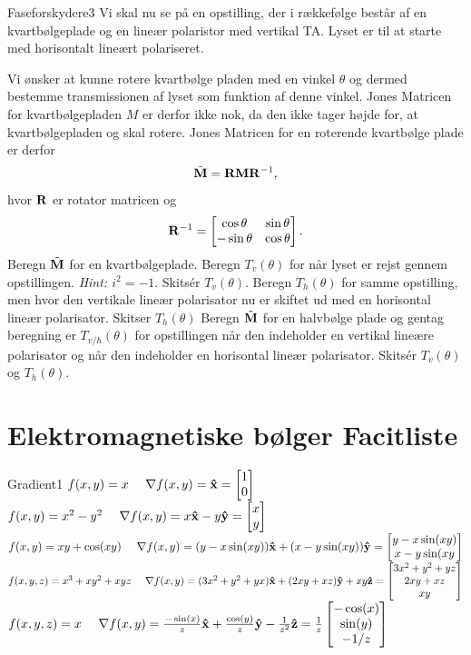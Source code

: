 \begin{opgave}{Faseforskydere}{3}
Vi skal nu se på en opstilling, der i rækkefølge består af en kvartbølgeplade og en lineær polaristor med vertikal TA. Lyset er til at starte med horisontalt lineært polariseret. 

Vi ønsker at kunne rotere kvartbølge pladen med en vinkel $\theta$ og dermed bestemme transmissionen af lyset som funktion af denne vinkel. Jones Matricen for kvartbølgepladen $M$ er derfor ikke nok, da den ikke tager højde for, at kvartbølgepladen og skal rotere. Jones Matricen for en roterende kvartbølge plade er derfor 
\begin{equation}
\tilde{\mathbf{M}} = \mathbf{R} \mathbf{M} \mathbf{R}^{-1}, 
\end{equation}
hvor $\mathbf{R}$ er rotator matricen og 
\begin{equation}
\mathbf{R}^{-1} = \begin{bmatrix}
\cos\theta & \sin\theta \\
-\sin\theta & \cos\theta \\
\end{bmatrix}.
\end{equation}
\opg Beregn $\tilde{\mathbf{M}}$ for en kvartbølgeplade. 
\opg Beregn $T_v(\theta)$ for når lyset er rejst gennem opstillingen. \emph{Hint: $i^2=-1$}. Skitsér $T_v(\theta)$. 
\opg Beregn $T_h(\theta)$ for samme opstilling, men hvor den vertikale lineær polarisator nu er skiftet ud med en horisontal lineær polarisator. Skitser $T_h(\theta)$
\opg Beregn $\tilde{\mathbf{M}}$ for en halvbølge plade og gentag beregning er $T_{v/h}(\theta)$ for opstillingen når den indeholder en vertikal lineære polarisator og når den indeholder en horisontal lineær polarisator. Skitsér $T_v(\theta)$ og $T_h(\theta)$. 
\end{opgave}

\newpage
\chapter{Elektromagnetiske bølger Facitliste}
\begin{opgave}{Gradient}{1}
\opg $f(x,y) = x ~~~~\mathbf{\nabla} f(x,y) = \mathbf{\hat{x}} = \begin{bmatrix} 1 \\ 0 \end{bmatrix}$
\opg $f(x,y) = x^2-y^2 ~~~~\mathbf{\nabla} f(x,y) = x\mathbf{\hat{x}}-y\mathbf{\hat{y}}=\begin{bmatrix} x \\ y \end{bmatrix}$
\opg $f(x,y) = xy+\cos(xy) ~~~~\mathbf{\nabla} f(x,y) = (y-x\sin(xy))\mathbf{\hat{x}}+(x-y\sin(xy))\mathbf{\hat{y}} = \begin{bmatrix} y-x\sin(xy) \\ x-y\sin(xy \end{bmatrix}$
\opg $f(x,y,z) = x^3+xy^2+xyz ~~~~\mathbf{\nabla} f(x,y) = (3x^2+y^2+yx)\mathbf{\hat{x}}+(2xy+xz)\mathbf{\hat{y}}+xy\mathbf{\hat{z}} = \begin{bmatrix} 3x^2+y^2+yz \\ 2xy+xz \\ xy \end{bmatrix}$
\opg $f(x,y,z) = x ~~~~\mathbf{\nabla} f(x,y) = \frac{-\sin(x)}{z}\mathbf{\hat{x}}+\frac{\cos(y)}{z}\mathbf{\hat{y}}-\frac{1}{z^2}\mathbf{\hat{z}} = \frac{1}{z}\begin{bmatrix} -\cos(x) \\ \sin(y) \\ -1/z \end{bmatrix}$
\end{opgave}



